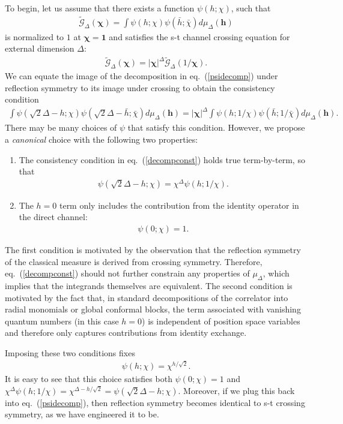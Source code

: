 \documentclass[a4paper,11pt]{article}
\theoremstyle{plain}
\theoremstyle{definition}
\theoremstyle{remark}
\newcommand{\bs}[1]{\boldsymbol{#1}}
\newcommand{\bh}{{\bar{h}}}
\newcommand{\ba}{\begin{equation} \begin{aligned}}
\newcommand{\ea}{\end{aligned} \end{equation}}
\newcommand{\De}{\Delta}
\begin{document}
To begin, let us assume that there exists a function $\psi(h;\chi)$, such that
\ba
\tilde{\mathcal{G}}_\De(\bs{\chi}) = \int  \psi(h;\chi) \psi(\bh;\bar{\chi})d\mu_\De(\bs{h})
\label{psidecomp}
\ea
is normalized to $1$ at $\bs{\chi} = \mathbf{1}$ and satisfies the s-t channel crossing equation for external dimension $\Delta$:
\ba
\tilde{\mathcal{G}}_\De(\bs{\chi})  = |\bs{\chi}|^\De \tilde{\mathcal{G}}_\De(1/\bs{\chi}) .
\ea
We can equate the image of the decomposition in eq.~(\ref{psidecomp}) under reflection symmetry to its image under crossing to obtain the consistency condition
\ba
\int  \psi(\sqrt{2}\De - h;\chi) \psi(\sqrt{2}\De - \bh;\bar{\chi})d\mu_\De(\bs{h}) = |\bs{\chi}|^\De\int \psi(h;1/\chi) \psi(\bh;1/\bar{\chi}) d\mu_\De(\bs{h}) .
\label{decompconst}
\ea
\noindent There may be many choices of $\psi$ that satisfy this condition. However, we propose a \textit{canonical} choice with the following two properties:
\begin{enumerate}
    \item The consistency condition in eq.~(\ref{decompconst}) holds true term-by-term, so that
    \ba
    \psi(\sqrt{2}\De - h;\chi) = \chi^\De \psi(h;1/\chi).
    \ea
    \item The $h = 0$ term only includes the contribution from the identity operator in the direct channel:
    \ba
    \psi(0;\chi ) = 1.
    \ea
\end{enumerate}
The first condition is motivated by the observation that the reflection symmetry of the classical measure is derived from crossing symmetry. Therefore, eq.~(\ref{decompconst}) should not further constrain any properties of $\mu_\De$, which implies that the integrands themselves are equivalent. The second condition is motivated by the fact that, in standard decompositions of the correlator into radial monomials or global conformal blocks, the term associated with vanishing quantum numbers (in this case $h = 0$) is independent of position space variables and therefore only captures contributions from identity exchange. 

Imposing these two conditions fixes
\ba
\psi(h;\chi) = \chi^{h/\sqrt{2}}.
\ea
It is easy to see that this choice satisfies both $\psi(0;\chi) = 1$ and $\chi^\De \psi(h;1/\chi) = \chi^{\De - h/\sqrt{2}} = \psi(\sqrt{2}\De - h;\chi)$. Moreover, if we plug this back into eq.~(\ref{psidecomp}), then reflection symmetry becomes identical to s-t crossing symmetry, as we have engineered it to be. 
\end{document}
